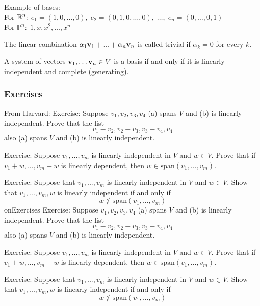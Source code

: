 \documentclass{article}
\begin{document}
Example of bases: \\
For ${\mathbb{R}}^n$: $e_1 = (1,0,\ldots, 0), \; e_2 = (0,1,0,\ldots,0), \; \ldots, \; e_n = (0, \ldots, 0, 1)$ \\
For $\mathbb{P}^n: \; 1, x, x^2, \ldots, x^n$

\begin{definition}
The linear combination $\alpha_{1}{\mathbf{v}}_{1}+...+\alpha_{n}{\mathbf{v}}_{n}$ is called trivial if $\alpha_k = 0$ for every $k$.
\end{definition}

\begin{proposition}
 A system of vectors ${\mathbf{v}}_1, \ldots {\mathbf{v}}_n \in V$ is a basis if and only if it is linearly independent and complete (generating).
\end{proposition}


\subsubsection{Exercises}
From Harvard:
Exercise: Suppose $v_{1},v_{2},v_{3},v_{4}$ (a) spans $V$ and (b)
is linearly independent. Prove that the list 
\[
v_{1}-v_{2},v_{2}-v_{3},v_{3}-v_{4},v_{4}
\]
 also (a) spans $V$ and (b) is linearly independent. 

\vspace{7mm}

Exercise: Suppose $v_{1},...,v_{m}$ is linearly independent in $V$
and $w\in V$. Prove that if $v_{1}+w,...,v_{m}+w$ is linearly dependent,
then $w\in\text{span}(v_{1},...,v_{m})$. 

Exercise: Suppose that $v_{1},...,v_{m}$ is linearly independent
in $V$ and $w\in V$. Show that $v_{1},...,v_{m},w$ is linearly
independent if and only if 
\[
w\notin\text{span}(v_{1},...,v_{m})
\]
on{Exercises}
Exercise: Suppose $v_{1},v_{2},v_{3},v_{4}$ (a) spans $V$ and (b)
is linearly independent. Prove that the list 
\[
v_{1}-v_{2},v_{2}-v_{3},v_{3}-v_{4},v_{4}
\]
 also (a) spans $V$ and (b) is linearly independent. 

Exercise: Suppose $v_{1},...,v_{m}$ is linearly independent in $V$
and $w\in V$. Prove that if $v_{1}+w,...,v_{m}+w$ is linearly dependent,
then $w\in\text{span}(v_{1},...,v_{m})$. 

Exercise: Suppose that $v_{1},...,v_{m}$ is linearly independent
in $V$ and $w\in V$. Show that $v_{1},...,v_{m},w$ is linearly
independent if and only if 
\[
w\notin\text{span}(v_{1},...,v_{m})
\]
\end{document}
